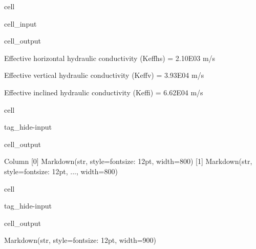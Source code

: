 \documentclass[letterpaper,10pt,english]{jupyterBook}
\begin{document}
\begin{sphinxuseclass}{cell}
\begin{sphinxVerbatimInput}
\begin{sphinxuseclass}{cell_input}
\end{sphinxuseclass}\end{sphinxVerbatimInput}
\begin{sphinxVerbatimOutput}

\begin{sphinxuseclass}{cell_output}
\begin{sphinxVerbatim}[commandchars=\\\{\}]
Effective horizontal hydraulic conductivity (Keff\PYGZus{}hs) = 2.10E\PYGZhy{}03 m/s

Effective vertical hydraulic conductivity (Keff\PYGZus{}v) = 3.93E\PYGZhy{}04 m/s

Effective inclined hydraulic conductivity (Keff\PYGZus{}i) = 6.62E\PYGZhy{}04 m/s
\end{sphinxVerbatim}

\end{sphinxuseclass}\end{sphinxVerbatimOutput}

\end{sphinxuseclass}
\begin{sphinxuseclass}{cell}
\begin{sphinxuseclass}{tag_hide-input}\begin{sphinxVerbatimOutput}

\begin{sphinxuseclass}{cell_output}
\begin{sphinxVerbatim}[commandchars=\\\{\}]
Column
    [0] Markdown(str, style=\PYGZob{}\PYGZsq{}font\PYGZhy{}size\PYGZsq{}: \PYGZsq{}12pt\PYGZsq{}\PYGZcb{}, width=800)
    [1] Markdown(str, style=\PYGZob{}\PYGZsq{}font\PYGZhy{}size\PYGZsq{}: \PYGZsq{}12pt\PYGZsq{}, ...\PYGZcb{}, width=800)
\end{sphinxVerbatim}

\end{sphinxuseclass}\end{sphinxVerbatimOutput}

\end{sphinxuseclass}
\end{sphinxuseclass}
\begin{sphinxuseclass}{cell}
\begin{sphinxuseclass}{tag_hide-input}\begin{sphinxVerbatimOutput}

\begin{sphinxuseclass}{cell_output}
\begin{sphinxVerbatim}[commandchars=\\\{\}]
Markdown(str, style=\PYGZob{}\PYGZsq{}font\PYGZhy{}size\PYGZsq{}: \PYGZsq{}12pt\PYGZsq{}\PYGZcb{}, width=900)
\end{sphinxVerbatim}

\end{sphinxuseclass}\end{sphinxVerbatimOutput}

\end{sphinxuseclass}
\end{sphinxuseclass}
\sphinxstepscope
\end{document}
